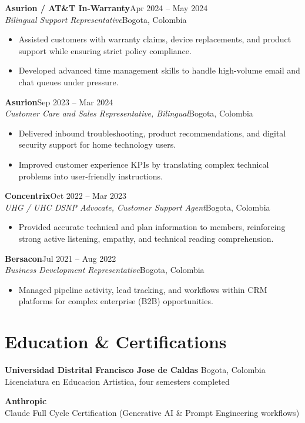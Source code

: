\documentclass[10pt,letterpaper]{article}
\newcommand{\role}[4]{%
  \textbf{\color{ink}#1}\hfill{\color{muted}\small #2}\\
  {\itshape #3}\hfill{\color{muted}\small #4}
}
\begin{document}
\role{Asurion / AT\&T In-Warranty}{Apr 2024 -- May 2024}{Bilingual Support Representative}{Bogota, Colombia}
\begin{itemize}
  \item Assisted customers with warranty claims, device replacements, and product support while ensuring strict policy compliance.
  \item Developed advanced time management skills to handle high-volume email and chat queues under pressure.
\end{itemize}

\role{Asurion}{Sep 2023 -- Mar 2024}{Customer Care and Sales Representative, Bilingual}{Bogota, Colombia}
\begin{itemize}
  \item Delivered inbound troubleshooting, product recommendations, and digital security support for home technology users.
  \item Improved customer experience KPIs by translating complex technical problems into user-friendly instructions.
\end{itemize}

\role{Concentrix}{Oct 2022 -- Mar 2023}{UHG / UHC DSNP Advocate, Customer Support Agent}{Bogota, Colombia}
\begin{itemize}
  \item Provided accurate technical and plan information to members, reinforcing strong active listening, empathy, and technical reading comprehension.
\end{itemize}

\role{Bersacon}{Jul 2021 -- Aug 2022}{Business Development Representative}{Bogota, Colombia}
\begin{itemize}
  \item Managed pipeline activity, lead tracking, and workflows within CRM platforms for complex enterprise (B2B) opportunities.
\end{itemize}

\section{Education \& Certifications}
\textbf{Universidad Distrital Francisco Jose de Caldas} \hfill {\color{muted}\small Bogota, Colombia}\\
Licenciatura en Educacion Artistica, four semesters completed

\vspace{4pt}
\textbf{Anthropic}\\
Claude Full Cycle Certification (Generative AI \& Prompt Engineering workflows)
\end{document}
